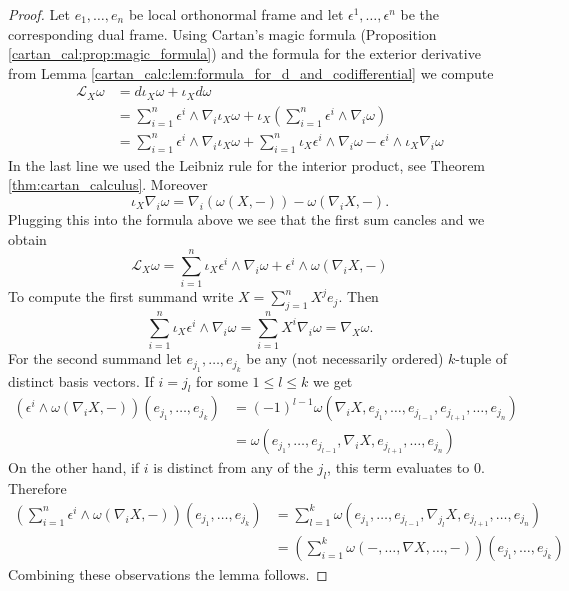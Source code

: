 \begin{proof}
    Let $e_1,\ldots,e_n$ be local orthonormal frame and let $\epsilon^1,\ldots,\epsilon^n$ be the corresponding dual frame. Using Cartan's magic formula (Proposition \ref{cartan_cal:prop:magic_formula}) and the formula for the exterior derivative from Lemma \ref{cartan_calc:lem:formula_for_d_and_codifferential} we compute 
    \begin{align*}
    \mathcal{L}_X\omega & = d\iota_X\omega + \iota_X d \omega \\
                        & = \sum_{i=1}^{n}  \epsilon^i \wedge \nabla_i \iota_X\omega + \iota_X \left(\sum_{i=1}^{n} \epsilon^i \wedge \nabla_i \omega\right) \\
                        & = \sum_{i=1}^{n}  \epsilon^i \wedge \nabla_i \iota_X\omega + \sum_{i=1}^{n} \iota_X \epsilon^i \wedge \nabla_i \omega - \epsilon^i \wedge \iota_X \nabla_i \omega 
    \end{align*}
    In the last line we used the Leibniz rule for the interior product, see Theorem \ref{thm:cartan_calculus}. Moreover 
    \[
    \iota_X \nabla_i \omega = \nabla_i(\omega(X,-)) - \omega(\nabla_iX,-).
    \]
    Plugging this into the formula above we see that the first sum cancles and we obtain 
    \[
    \mathcal{L}_X\omega = \sum_{i=1}^{n} \iota_X \epsilon^i \wedge \nabla_i \omega + \epsilon^i \wedge \omega(\nabla_iX,-)
    \]
    To compute the first summand write $X = \sum_{j=1}^{n}X^je_j$. Then 
    \[
    \sum_{i=1}^{n} \iota_X \epsilon^i \wedge \nabla_i \omega = \sum_{i=1}^{n} X^i \nabla_i \omega = \nabla_X \omega.
    \]
    For the second summand let $e_{j_1},\ldots,e_{j_k}$ be any (not necessarily ordered) $k$-tuple of distinct basis vectors. If $i = j_l$ for some $1 \leq l \leq k$ we get 
    \begin{align*}
    (\epsilon^i \wedge \omega(\nabla_iX,-))(e_{j_1},\ldots,e_{j_k}) & = (-1)^{l-1}\omega(\nabla_iX,e_{j_1},\ldots,e_{j_{l-1}},e_{j_{l+1}},\ldots,e_{j_n}) \\ 
    &= \omega(e_{j_1},\ldots,e_{j_{l-1}},\nabla_iX,e_{j_{l+1}},\ldots,e_{j_n}) 
    \end{align*}
    On the other hand, if $i$ is distinct from any of the $j_l$, this term evaluates to $0$. Therefore
    \begin{align*}
        \left(\sum_{i=1}^{n} \epsilon^i \wedge \omega(\nabla_iX,-)\right)(e_{j_1},\ldots,e_{j_k}) &= \sum_{l=1}^k \omega(e_{j_1},\ldots,e_{j_{l-1}},\nabla_{j_l}X,e_{j_{l+1}},\ldots,e_{j_n}) \\
        &= \left(\sum_{i=1}^{k} \omega(-,\ldots,\nabla X,\ldots,-)\right)(e_{j_1},\ldots,e_{j_k})
    \end{align*}
    Combining these observations the lemma follows.
\end{proof}

